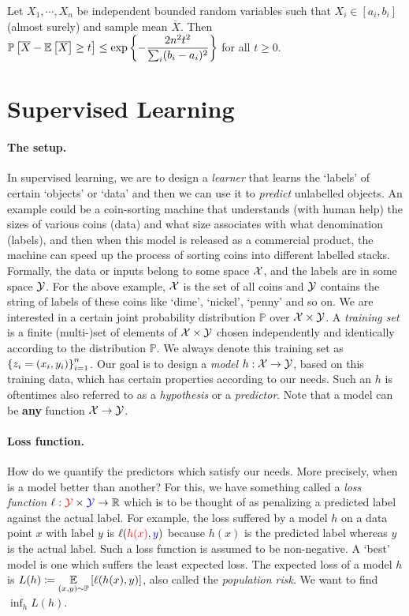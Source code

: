 \begin{cor}
Let $X_{1},\cdots,X_{n}$ be independent bounded random variables such that $X_{i}\in[a_{i},b_{i}]$ (almost surely) and sample mean $\overline X$. Then $\displaystyle\mathbb P\left[ \overline X - \mathbb E\left[ \overline X \right] \ge t \right] \le \exp\left\{-\frac{2n^{2}t^{2}}{\sum_{i}(b_{i}-a_{i})^{2}}\right\}$ for all $t\ge 0$.
\end{cor}



\section{Supervised Learning}
\paragraph{The setup.} In supervised learning, we are to design a \textit{learner} that learns the `labels' of certain `objects' or `data' and then we can use it to \textit{predict} unlabelled objects. An example could be a coin-sorting machine that understands (with human help) the sizes of various coins (data) and what size associates with what denomination (labels), and then when this model is released as a commercial product, the machine can speed up the process of sorting coins into different labelled stacks. 
\\
Formally, the data or inputs belong to some space ${\mathcal{X}}$, and the labels are in some space ${\mathcal{Y}}$. For the above example, ${\mathcal{X}}$ is the set of all coins and ${\mathcal{Y}}$ contains the string of labels of these coins like `dime', `nickel', `penny' and so on. We are interested in a certain joint probability distribution $\mathbb P$ over ${\mathcal{X}}\times {\mathcal{Y}}$. A \textit{training set} is a finite (multi-)set of elements of ${\mathcal{X}}\times {\mathcal{Y}}$ chosen independently and identically according to the distribution $\mathbb P$. We always denote this training set as $\left\{z_{i}=(x_{i},y_{i})\right\}_{i=1}^{n}$. Our goal is to design a \textit{model} $h:{\mathcal{X}}\to{\mathcal{Y}}$, based on this training data, which has certain properties according to our needs. Such an $h$ is oftentimes also referred to as a \textit{hypothesis} or a \textit{predictor}. Note that a model can be \textbf{any} function ${\mathcal{X}}\to{\mathcal{Y}}$.

\paragraph{Loss function.} How do we quantify the predictors which satisfy our needs. More precisely, when is a model better than another? For this, we have something called a \textit{loss function} $\ell:{\color{red}{\mathcal{Y}}}\times {\color{blue}{\mathcal{Y}}} \to \mathbb{R}$ which is to be thought of as penalizing a {\color{red}predicted label} against the {\color{blue}actual label}. For example, the loss suffered by a model $h$ on a data point $x$ with label $y$ is $\ell({\color{red}h(x)},{\color{blue}y})$ because $h(x)$ is the predicted label whereas $y$ is the actual label. Such a loss function is assumed to be non-negative. A `best' model is one which suffers the least expected loss. The expected loss of a model $h$ is $\displaystyle L(h) \coloneqq \underset{(x,y)\sim\mathbb P}{\mathbb E} \left[\ell(h(x),y)\right]$, also called the \textit{population risk}. We want to find $\inf_{h} L(h)$.

